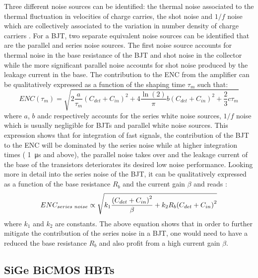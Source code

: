 		Three different noise sources can be identified: the thermal noise associated to the thermal fluctuation in velocities of charge carries, the shot noise and $1/f$ noise which are collectively associated to the variation in number density of charge carriers \cite{detectors}.
		For a BJT, two separate equivalent noise sources can be identified that are the parallel and series noise sources. The first noise source accounts for thermal noise in the base resistance of the BJT and shot noise in the collector while the more significant parallel noise accounts for shot noise produced by the leakage current in the base. The contribution to the ENC from the amplifier can be qualitatively expressed as a function of the shaping time $\tau_m$ such that:    
		\begin{equation}
  			ENC(\tau_m) = \sqrt{2 \frac{a}{\tau_m} {\left( C_{det} + C_{in} \right)}^2 + 4 \frac{\ln(2)}{\pi} b{\left( C_{det} + C_{in} \right)}^2 + \frac{2}{3}c \tau_m} 
		\end{equation}
		where $a$, $b$ and$c$ respectively accounts for the series white noise sources, $1/f$ noise which is usually negligible for BJTs \cite{Paolozzi_thesis} and parallel white noise sources. This expression shows that for integration of fast signals, the contribution of the BJT to the ENC will be dominated by the series noise while at higher integration times ( \SI{1}{\micro\second} and above), the parallel noise takes over and the leakage current of the base of the transistors deteriorates its desired low noise performance. Looking more in detail into the series noise of the BJT, it can be qualitatively expressed as a function of the base resistance $R_b$ and the current gain $\beta$ and reads \cite{Paolozzi_thesis}: 
		\begin{equation}
  			ENC_{series \hspace{1mm} noise} \propto \sqrt{k_1 \frac{{\left( C_{det} + C_{in} \right)}^2}{\beta} + k_2 R_b {\left( C_{det} + C_{in} \right)}^2}
  			\label{eq:ENC_series}
		\end{equation}
		where $k_1$ and $k_2$ are constants. The above equation shows that in order to further mitigate the contribution of the series noise in a BJT, one would need to have a reduced the base resistance $R_b$ and also profit from a high current gain $\beta$. 

		
		\subsection{SiGe BiCMOS HBTs}\label{subsec:2.3.4}
		

